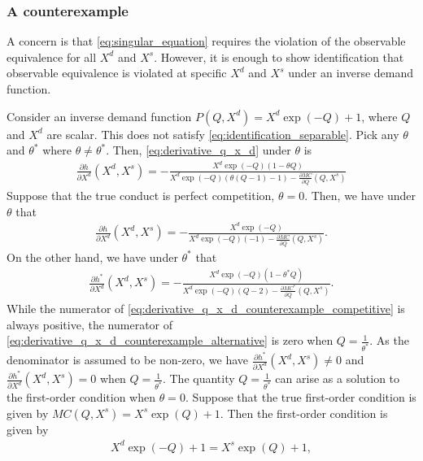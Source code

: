 \documentclass[11pt, a4paper]{article}
\theoremstyle{remark}
\begin{document}
\subsubsection{A counterexample}\label{sec:counterexample_lau}

A concern is that \eqref{eq:singular_equation} requires the violation of the observable equivalence for all $X^{d}$ and $X^{s}$.
However, it is enough to show identification that observable equivalence is violated at specific $X^{d}$ and $X^{s}$ under an inverse demand function.

Consider an inverse demand function $P(Q,X^{d}) = X^{d}\exp(-Q) + 1$, where $Q$ and $X^{d}$ are scalar.
This does not satisfy \eqref{eq:identification_separable}.
Pick any $\theta$ and $\theta^{*}$ where $\theta \ne \theta^{*}$.
Then, \eqref{eq:derivative_q_x_d} under $\theta$ is
\begin{align}
    \frac{\partial h}{\partial X^{d}}(X^{d}, X^{s})  = - \frac{X^{d}\exp(-Q)(1-\theta Q)}{X^{d}\exp(-Q)(\theta(Q- 1) -1) - \frac{\partial MC}{\partial Q}(Q, X^{s})} 
\end{align}
Suppose that the true conduct is perfect competition, $\theta = 0$.
Then, we have under $\theta$ that 
\begin{align}
    \frac{\partial h}{\partial X^{d}}(X^{d}, X^{s}) = - \frac{X^{d}\exp(-Q)}{X^{d}\exp(-Q)(-1) - \frac{\partial MC}{\partial Q}(Q, X^{s})}. \label{eq:derivative_q_x_d_counterexample_competitive}
\end{align}
On the other hand, we have under $\theta^{*}$ that
\begin{align}
    \frac{\partial h^{*}}{\partial X^{d}}(X^{d}, X^{s}) = - \frac{X^{d}\exp(-Q)(1 - \theta^{*} Q)}{X^{d}\exp(-Q)(Q -2) - \frac{\partial MC^{*}}{\partial Q}(Q, X^{s})}. \label{eq:derivative_q_x_d_counterexample_alternative}
\end{align}
While the numerator of \eqref{eq:derivative_q_x_d_counterexample_competitive} is always positive, the numerator of \eqref{eq:derivative_q_x_d_counterexample_alternative} is zero when $Q = \frac{1}{\theta^{*}}$.
As the denominator is assumed to be non-zero, we have $\frac{\partial h^{*}}{\partial X^{d}}(X^{d}, X^{s}) \ne 0$ and $\frac{\partial h^{*}}{\partial X^{d}}(X^{d}, X^{s}) = 0$ when $Q = \frac{1}{\theta^{*}}$.
The quantity $Q = \frac{1}{\theta^{*}}$ can arise as a solution to the first-order condition when $\theta = 0$.
Suppose that the true first-order condition is given by $MC(Q, X^{s}) = X^{s}\exp(Q) + 1$.
Then the first-order condition is given by
\begin{align}
    X^{d}\exp(-Q) + 1 = X^{s}\exp(Q) + 1,
\end{align}
\end{document}
